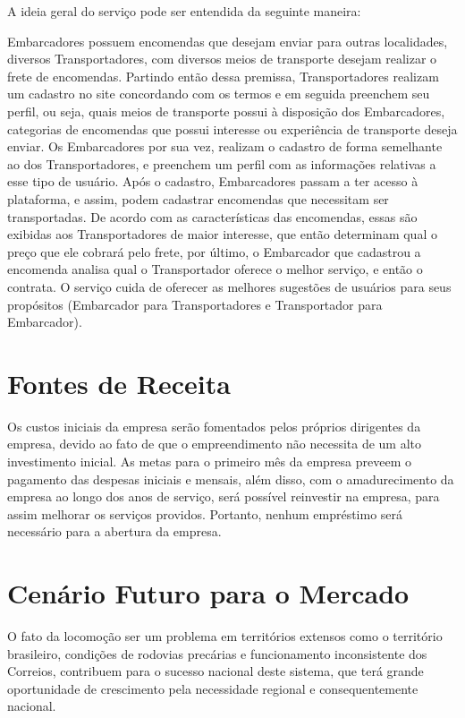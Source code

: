 		A ideia geral do serviço pode ser entendida da seguinte maneira: 
		
		Embarcadores possuem encomendas que desejam enviar para outras localidades, diversos Transportadores, com diversos meios de transporte desejam realizar o frete de encomendas. Partindo então dessa premissa, Transportadores realizam um cadastro no site concordando com os termos e em seguida preenchem seu perfil, ou seja, quais meios de transporte possui à disposição dos Embarcadores, categorias de encomendas que possui interesse ou experiência de transporte deseja enviar. Os Embarcadores por sua vez, realizam o cadastro de forma semelhante ao dos Transportadores, e preenchem um perfil com as informações relativas a esse tipo de usuário. Após o cadastro, Embarcadores passam a ter acesso à plataforma, e assim, podem cadastrar encomendas que necessitam ser transportadas. De acordo com as características das encomendas, essas são exibidas aos Transportadores de maior interesse, que então determinam qual o preço que ele cobrará pelo frete, por último, o Embarcador que cadastrou a encomenda analisa qual o Transportador oferece o melhor serviço, e então o contrata. O serviço cuida de oferecer as melhores sugestões de usuários para seus propósitos (Embarcador para Transportadores e Transportador para Embarcador).

	\section{Fontes de Receita}
	
		Os custos iniciais da empresa serão fomentados pelos próprios dirigentes da empresa, devido ao fato de que o empreendimento não necessita de um alto investimento inicial. As metas para o primeiro mês da empresa preveem o pagamento das despesas iniciais e mensais, além disso, com o amadurecimento da empresa ao longo dos anos de serviço, será possível reinvestir na empresa, para assim melhorar os serviços providos. Portanto, nenhum empréstimo será necessário para a abertura da empresa.

	\section{Cenário Futuro para o Mercado}
	
		O fato da locomoção ser um problema em territórios extensos como o território brasileiro, condições de rodovias precárias e funcionamento inconsistente dos Correios, contribuem para o sucesso nacional deste sistema, que terá grande oportunidade de crescimento pela necessidade regional e consequentemente nacional.
		
